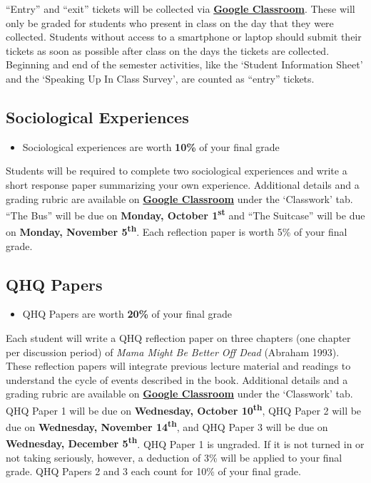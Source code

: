 \documentclass[]{book}
\newenvironment{rmdblock}[1]
  {\begin{shaded*}
  \begin{itemize}
  \renewcommand{\labelitemi}{
    \raisebox{-.7\height}[0pt][0pt]{
      {\setkeys{Gin}{width=3em,keepaspectratio}\texttt{[image: images/\#1]}}
    }
  }
  \item
  }
  {
  \end{itemize}
  \end{shaded*}
  }
\newenvironment{rmdtip}
  {\begin{rmdblock}{tip}}
  {\end{rmdblock}}
\theoremstyle{definition}
\theoremstyle{definition}
\theoremstyle{definition}
\theoremstyle{remark}
\begin{document}
``Entry'' and ``exit'' tickets will be collected via
\textbf{\href{https://classroom.google.com}{Google Classroom}}. These
will only be graded for students who present in class on the day that
they were collected. Students without access to a smartphone or laptop
should submit their tickets as soon as possible after class on the days
the tickets are collected. Beginning and end of the semester activities,
like the `Student Information Sheet' and the `Speaking Up In Class
Survey', are counted as ``entry'' tickets.

\hypertarget{sociological-experiences}{%
\subsection{Sociological Experiences}\label{sociological-experiences}}

\begin{rmdtip}
Sociological experiences are worth \textbf{10\%} of your final grade
\end{rmdtip}

Students will be required to complete two sociological experiences and
write a short response paper summarizing your own experience. Additional
details and a grading rubric are available on
\textbf{\href{https://classroom.google.com}{Google Classroom}} under the
`Classwork' tab. ``The Bus'' will be due on \textbf{Monday, October
1\textsuperscript{st}} and ``The Suitcase'' will be due on
\textbf{Monday, November 5\textsuperscript{th}}. Each reflection paper
is worth 5\% of your final grade.

\hypertarget{qhq-papers}{%
\subsection{QHQ Papers}\label{qhq-papers}}

\begin{rmdtip}
QHQ Papers are worth \textbf{20\%} of your final grade
\end{rmdtip}

Each student will write a QHQ reflection paper on three chapters (one
chapter per discussion period) of \emph{Mama Might Be Better Off Dead}
(Abraham 1993). These reflection papers will integrate previous lecture
material and readings to understand the cycle of events described in the
book. Additional details and a grading rubric are available on
\textbf{\href{https://classroom.google.com}{Google Classroom}} under the
`Classwork' tab. QHQ Paper 1 will be due on \textbf{Wednesday, October
10\textsuperscript{th}}, QHQ Paper 2 will be due on \textbf{Wednesday,
November 14\textsuperscript{th}}, and QHQ Paper 3 will be due on
\textbf{Wednesday, December 5\textsuperscript{th}}. QHQ Paper 1 is
ungraded. If it is not turned in or not taking seriously, however, a
deduction of 3\% will be applied to your final grade. QHQ Papers 2 and 3
each count for 10\% of your final grade.
\end{document}

